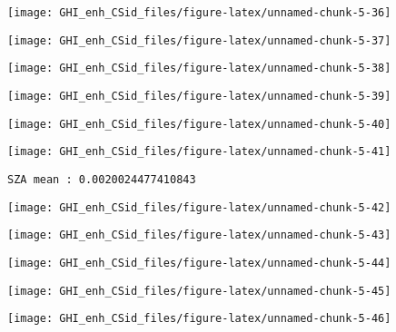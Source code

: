 \documentclass[
  10pt,
  a4paper,oneside]{article}
\begin{document}
\begin{center}\texttt{[image: GHI\_enh\_CSid\_files/figure-latex/unnamed-chunk-5-36]} \end{center}

\begin{center}\texttt{[image: GHI\_enh\_CSid\_files/figure-latex/unnamed-chunk-5-37]} \end{center}

\begin{center}\texttt{[image: GHI\_enh\_CSid\_files/figure-latex/unnamed-chunk-5-38]} \end{center}

\begin{center}\texttt{[image: GHI\_enh\_CSid\_files/figure-latex/unnamed-chunk-5-39]} \end{center}

\begin{center}\texttt{[image: GHI\_enh\_CSid\_files/figure-latex/unnamed-chunk-5-40]} \end{center}

\begin{center}\texttt{[image: GHI\_enh\_CSid\_files/figure-latex/unnamed-chunk-5-41]} \end{center}

\begin{verbatim}
SZA mean : 0.0020024477410843 
\end{verbatim}

\begin{center}\texttt{[image: GHI\_enh\_CSid\_files/figure-latex/unnamed-chunk-5-42]} \end{center}

\begin{center}\texttt{[image: GHI\_enh\_CSid\_files/figure-latex/unnamed-chunk-5-43]} \end{center}

\begin{center}\texttt{[image: GHI\_enh\_CSid\_files/figure-latex/unnamed-chunk-5-44]} \end{center}

\begin{center}\texttt{[image: GHI\_enh\_CSid\_files/figure-latex/unnamed-chunk-5-45]} \end{center}

\begin{center}\texttt{[image: GHI\_enh\_CSid\_files/figure-latex/unnamed-chunk-5-46]} \end{center}
\end{document}
